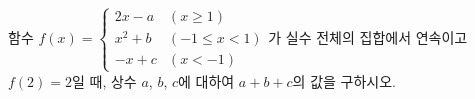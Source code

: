 함수 $f(x)=\begin{cases} 2x-a & (x\ge 1) \\ x^2+b & (-1\le x<1) \\ -x+c & (x<-1) \end{cases}$가 실수 전체의 집합에서 연속이고 $f(2)=2$일 때, 상수 $a$, $b$, $c$에 대하여 $a+b+c$의 값을 구하시오.
